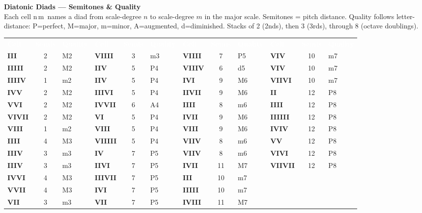 \documentclass[12pt]{article}
\begin{document}
{\Large\bfseries Diatonic Diads --- Semitones \& Quality}\\[2pt]
{\small Each cell n\,m\ names a diad from scale-degree $n$ to scale-degree $m$ in the major scale. Semitones = pitch distance. Quality follows letter-distance: P=perfect, M=major, m=minor, A=augmented, d=diminished. Stacks of 2 (2nds), then 3 (3rds), through 8 (octave doublings).}
\vspace{6pt}

\fontsize{16}{22}\selectfont
\begin{tabular}{@{}l c l l c l l c l l c l@{}}
\rowcolor{hdr}
\textcolor{white}{\bfseries Cell} & \textcolor{white}{\bfseries Semis} & \textcolor{white}{\bfseries Quality} & \textcolor{white}{\bfseries Cell} & \textcolor{white}{\bfseries Semis} & \textcolor{white}{\bfseries Quality} & \textcolor{white}{\bfseries Cell} & \textcolor{white}{\bfseries Semis} & \textcolor{white}{\bfseries Quality} & \textcolor{white}{\bfseries Cell} & \textcolor{white}{\bfseries Semis} & \textcolor{white}{\bfseries Quality} \\
\bfseries III & 2 & M2 & \bfseries VIIII & 3 & m3 & \bfseries VIIII & 7 & P5 & \bfseries VIV & 10 & m7 \\
\bfseries IIIII & 2 & M2 & \bfseries IIV & 5 & P4 & \bfseries VIIIV & 6 & d5 & \bfseries VIV & 10 & m7 \\
\bfseries IIIIV & 1 & m2 & \bfseries IIV & 5 & P4 & \bfseries IVI & 9 & M6 & \bfseries VIIVI & 10 & m7 \\
\bfseries IVV & 2 & M2 & \bfseries IIIVI & 5 & P4 & \bfseries IIVII & 9 & M6 & \bfseries II & 12 & P8 \\
\bfseries VVI & 2 & M2 & \bfseries IVVII & 6 & A4 & \bfseries IIII & 8 & m6 & \bfseries IIII & 12 & P8 \\
\bfseries VIVII & 2 & M2 & \bfseries VI & 5 & P4 & \bfseries IVII & 9 & M6 & \bfseries IIIIII & 12 & P8 \\
\bfseries VIII & 1 & m2 & \bfseries VIII & 5 & P4 & \bfseries VIII & 9 & M6 & \bfseries IVIV & 12 & P8 \\
\bfseries IIII & 4 & M3 & \bfseries VIIIII & 5 & P4 & \bfseries VIIV & 8 & m6 & \bfseries VV & 12 & P8 \\
\bfseries IIIV & 3 & m3 & \bfseries IV & 7 & P5 & \bfseries VIIV & 8 & m6 & \bfseries VIVI & 12 & P8 \\
\bfseries IIIV & 3 & m3 & \bfseries IIVI & 7 & P5 & \bfseries IVII & 11 & M7 & \bfseries VIIVII & 12 & P8 \\
\bfseries IVVI & 4 & M3 & \bfseries IIIVII & 7 & P5 & \bfseries III & 10 & m7 &  &  &  \\
\bfseries VVII & 4 & M3 & \bfseries IVI & 7 & P5 & \bfseries IIIII & 10 & m7 &  &  &  \\
\bfseries VII & 3 & m3 & \bfseries VII & 7 & P5 & \bfseries IVIII & 11 & M7 &  &  &  \\
\end{tabular}
\end{document}
